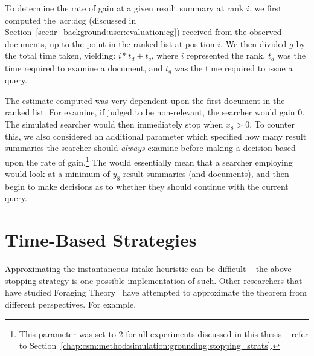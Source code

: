 To determine the rate of gain at a given result summary at rank $i$, we first computed the~\gls{acr:dcg} (discussed in Section~\ref{sec:ir_background:user:evaluation:cg}) received from the observed documents, up to the point in the ranked list at position $i$. We then divided $g$ by the total time taken, yielding: $i * t_d + t_q$, where $i$ represented the rank, $t_d$ was the time required to examine a document, and $t_q$ was the time required to issue a query.

The estimate computed was very dependent upon the first document in the ranked list. For examine, if judged to be non-relevant, the searcher would gain $0$. The simulated searcher would then immediately stop when $x_8 > 0$. To counter this, we also considered an additional parameter which specified how many result summaries the searcher should \emph{always} examine before making a decision based upon the rate of gain.\footnote{This parameter was set to 2 for all experiments discussed in this thesis -- refer to Section~\ref{chap:csm:method:simulation:grounding:stopping_strats}.} The would essentially mean that a searcher employing  would look at a minimum of $y_8$ result summaries (and documents), and then begin to make decisions as to whether they should continue with the current query.

\section{Time-Based Strategies}\label{sec:strategies:time}


Approximating the instantaneous intake heuristic can be difficult -- the above stopping strategy is one possible implementation of such. Other researchers that have studied Foraging Theory~\citep{stephens1986foraging_theory} have attempted to approximate the theorem from different perspectives. For example, 



